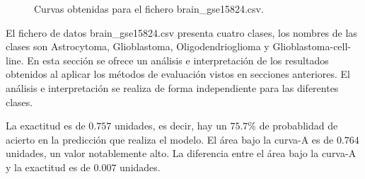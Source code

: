 \bigbreak

\begin{figure}[htp]
    \centering
    \caption{Curvas obtenidas para el fichero brain\_gse15824.csv.}
    \label{fig:10}
\end{figure}

\bigbreak

El fichero de datos brain\_gse15824.csv presenta cuatro clases, los nombres de las clases son Astrocytoma, Glioblastoma, Oligodendrioglioma y Glioblastoma-cell-line. En esta sección se ofrece un análisis e interpretación de los resultados obtenidos al aplicar los métodos de evaluación vistos en secciones anteriores. El análisis e interpretación se realiza de forma independiente para las diferentes clases.

\bigbreak

La exactitud es de $0.757$ unidades, es decir, hay un $75.7$\% de probablidad de acierto en la predicción que realiza el modelo. El área bajo la curva-A es de $0.764$ unidades, un valor notablemente alto. La diferencia entre el área bajo la curva-A y la exactitud es de $0.007$ unidades. 

\bigbreak

